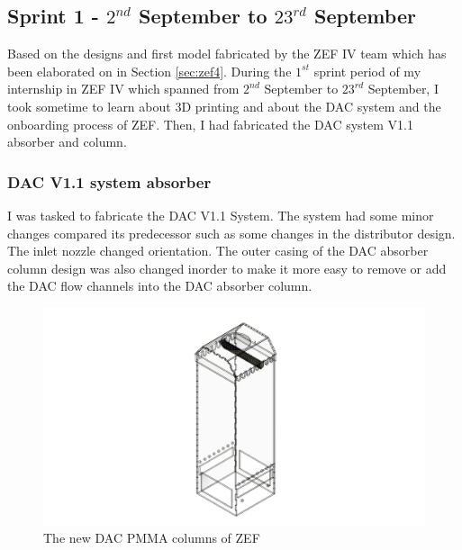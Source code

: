 \subsection{Sprint 1 - $2^{nd}$ September to $23^{rd}$ September}
\label{sec:sprint1}

Based on the designs and first model fabricated by the ZEF IV team which has been elaborated on in Section \ref{sec:zef4}. During the $1^{st}$ sprint period of my internship in ZEF IV which spanned from $2^{nd}$ September to $23^{rd}$ September, I took sometime to learn about 3D printing and about the DAC system and the onboarding process of ZEF. Then, I had fabricated the DAC system V1.1 absorber and column.  

\subsubsection{DAC V1.1 system absorber}


I was tasked to fabricate the DAC V1.1 System. The system had some minor changes compared its predecessor such as some changes in the distributor design. The inlet nozzle changed orientation. The outer casing of the DAC absorber column design was also changed inorder to make it more easy to remove or add the DAC flow channels into the DAC absorber column. 
\bigbreak

\begin{figure}[H]
    \centering
    \includegraphics[scale = 0.4]{images/mywork/Sprint1/Column.png}
    \caption{The new DAC PMMA columns of ZEF}
    \label{fig:daccolumn}
\end{figure}

